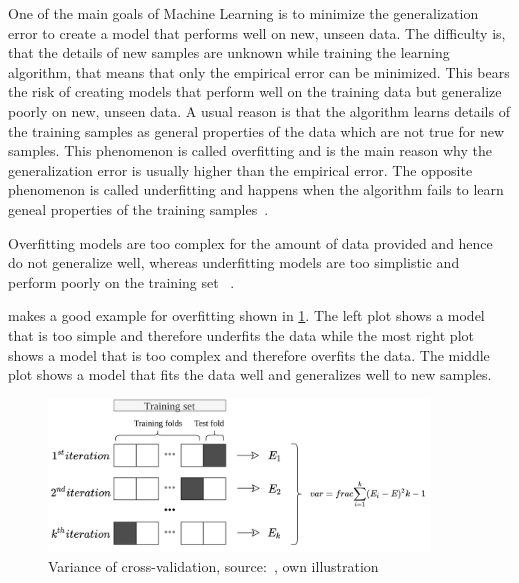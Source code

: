 One of the main goals of Machine Learning is to minimize the generalization error to create a model that performs well
on new, unseen data.
The difficulty is, that the details of new samples are unknown while training the learning algorithm, that means that
only the empirical error can be minimized.
This bears the risk of creating models that perform well on the training data but generalize poorly on new, unseen data.
A usual reason is that the algorithm learns details of the training samples as general properties of the data
which are not true for new samples.
This phenomenon is called overfitting and is the main reason why the generalization error is usually higher than the
empirical error.
The opposite phenomenon is called underfitting and happens when the algorithm fails to learn geneal properties of
the training samples~\cite[p. 26]{zhou2021machine}.

Overfitting models are too complex for the amount of data provided and hence do not generalize well, whereas
underfitting models are too simplistic and perform poorly on the training set
~\cite[p. 28]{muller2016introduction}.

\cite{badillo2020introduction} makes a good example for overfitting shown in
\cref{fig:overfitting_example}.
The left plot shows a model that is too simple and therefore underfits the data while the most right plot shows a model
that is too complex and therefore overfits the data.
The middle plot shows a model that fits the data well and generalizes well to new samples.

\begin{figure}[h]
    \begin{tcolorbox}[arc=0pt,boxrule=0.5pt]
        \centering
        \includegraphics[trim=left botm right top, width=0.9\textwidth]
        {chap2/images/cross_validation}
        \caption{Variance of cross-validation, source:~\cite[p. 260]{muller2016introduction}, own
        illustration }
        \label{fig:overfitting_example}
    \end{tcolorbox}
\end{figure}

